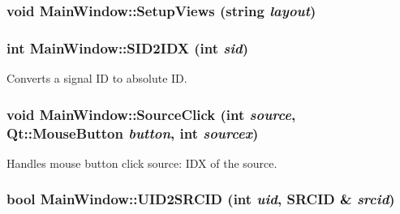 \hypertarget{class_main_window_1f4b0bdd2132d9adde0f145c7b52476c}{
\subsubsection[{SetupViews}]{\setlength{\rightskip}{0pt plus 5cm}void MainWindow::SetupViews (string {\em layout})}}
\label{class_main_window_1f4b0bdd2132d9adde0f145c7b52476c}


\hypertarget{class_main_window_1689a151f6cab2d4c2ffa7f9ae1a6adc}{
\subsubsection[{SID2IDX}]{\setlength{\rightskip}{0pt plus 5cm}int MainWindow::SID2IDX (int {\em sid})}}
\label{class_main_window_1689a151f6cab2d4c2ffa7f9ae1a6adc}


Converts a signal ID to absolute ID. 

\hypertarget{class_main_window_ac9949b31bd3f5977f19160ccbd26415}{
\subsubsection[{SourceClick}]{\setlength{\rightskip}{0pt plus 5cm}void MainWindow::SourceClick (int {\em source}, \/  Qt::MouseButton {\em button}, \/  int {\em sourcex})}}
\label{class_main_window_ac9949b31bd3f5977f19160ccbd26415}


Handles mouse button click source: IDX of the source. 

\hypertarget{class_main_window_c01dddc8c1010902718dc3eecd16540e}{
\subsubsection[{UID2SRCID}]{\setlength{\rightskip}{0pt plus 5cm}bool MainWindow::UID2SRCID (int {\em uid}, \/  {\bf SRCID} \& {\em srcid})}}
\label{class_main_window_c01dddc8c1010902718dc3eecd16540e}


